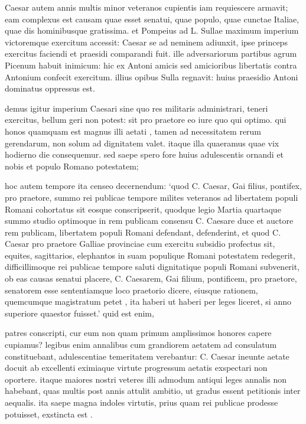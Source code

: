  Caesar autem annis multis minor veteranos cupientis iam requiescere armavit; eam complexus est causam quae esset senatui, quae populo, quae cunctae Italiae, quae dis hominibusque gratissima. et Pompeius ad L. Sullae maximum imperium victoremque exercitum accessit: Caesar se ad neminem adiunxit, ipse princeps exercitus faciendi et praesidi comparandi fuit. ille adversariorum partibus agrum Picenum habuit inimicum: hic ex Antoni amicis sed amicioribus libertatis contra Antonium confecit exercitum. illius opibus Sulla regnavit: huius praesidio Antoni dominatus oppressus est.

 demus igitur imperium Caesari sine quo res militaris administrari, teneri exercitus, bellum geri non potest: sit pro praetore eo iure quo qui optimo. qui honos quamquam est magnus illi aetati , tamen ad necessitatem rerum gerendarum, non solum ad dignitatem valet. itaque illa quaeramus quae vix hodierno die consequemur. sed saepe spero fore huius adulescentis ornandi et nobis et populo Romano potestatem;

 hoc autem tempore ita censeo decernendum: `quod C. Caesar, Gai filius, pontifex, pro praetore, summo rei publicae tempore milites veteranos ad libertatem populi Romani cohortatus sit eosque conscripserit, quodque legio Martia quartaque summo studio optimoque in rem publicam consensu C. Caesare duce et auctore rem publicam, libertatem populi Romani defendant, defenderint, et quod C. Caesar pro praetore Galliae provinciae cum exercitu subsidio profectus sit, equites, sagittarios, elephantos in suam populique Romani potestatem redegerit, difficillimoque rei publicae tempore saluti dignitatique populi Romani subvenerit, ob eas causas senatui placere, C. Caesarem, Gai filium, pontificem, pro praetore, senatorem esse sententiamque loco praetorio dicere, eiusque rationem, quemcumque magistratum petet , ita haberi ut haberi per leges liceret, si anno superiore quaestor fuisset.' quid est enim,

 patres conscripti, cur eum non quam primum amplissimos honores capere cupiamus? legibus enim annalibus cum grandiorem aetatem ad consulatum constituebant, adulescentiae temeritatem verebantur: C. Caesar ineunte aetate docuit ab excellenti eximiaque virtute progressum aetatis exspectari non oportere. itaque maiores nostri veteres illi admodum antiqui leges annalis non habebant, quas multis post annis attulit ambitio, ut gradus essent petitionis inter aequalis. ita saepe magna indoles virtutis, prius quam rei publicae prodesse potuisset, exstincta est .

